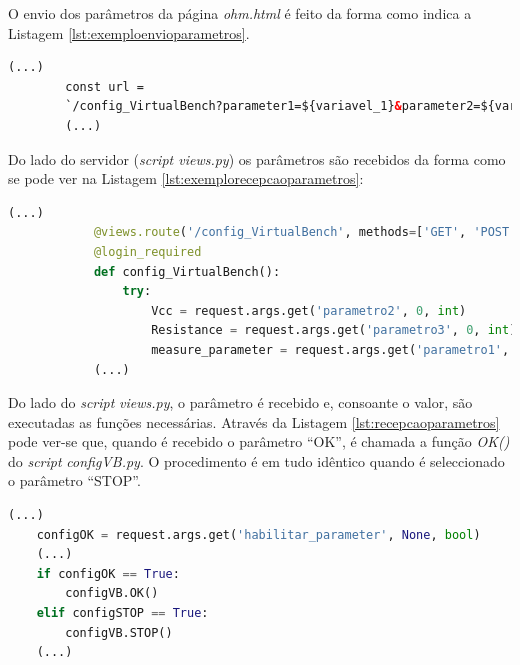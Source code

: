 O envio dos parâmetros da página \textit{ohm.html} é feito da forma como indica a Listagem \ref{lst:exemploenvioparametros}.

\begin{center}
	\begin{minipage}{0.7\linewidth}
		\begin{lstlisting}[language=Html, caption=Exemplo de envio de parâmetros da página \textit{ohm.html} para o \textit{script views.py}, label=lst:exemploenvioparametros]
		(...)
		const url = 
		`/config_VirtualBench?parameter1=${variavel_1}&parameter2=${variavel2}&parameter3=${variavel3}`
		(...)
	\end{lstlisting}
	\end{minipage}
\end{center}

Do lado do servidor (\textit{script views.py}) os parâmetros são recebidos da forma como se pode ver na Listagem \ref{lst:exemplorecepcaoparametros}:
\begin{center}
	\begin{minipage}{1\linewidth}
		\begin{lstlisting}[language=Python, caption=Exemplo da recepção dos parâmetros no \textit{script views.py} enviados da página \textit{ohm.html}, label=lst:exemplorecepcaoparametros]
			(...)
			@views.route('/config_VirtualBench', methods=['GET', 'POST'])
			@login_required
			def config_VirtualBench():
				try:
					Vcc = request.args.get('parametro2', 0, int)
					Resistance = request.args.get('parametro3', 0, int)
					measure_parameter = request.args.get('parametro1', 0, str)
			(...)
		\end{lstlisting}
	\end{minipage}
\end{center}

Do lado do \textit{script} \textit{views.py}, o parâmetro é recebido e, consoante o valor, são executadas as funções necessárias. Através da Listagem \ref{lst:recepcaoparametros} pode ver-se que, quando é recebido o parâmetro ``OK'', é chamada a função \textit{OK()} do \textit{script} \textit{configVB.py}. O procedimento é em tudo idêntico quando é seleccionado o parâmetro ``STOP''.

\begin{minipage}{0.9\linewidth}
	\begin{lstlisting}[language=python, caption=Recepção de parâmetros enviados de \textit{ohm.html}, label=lst:recepcaoparametros]
	(...)
	configOK = request.args.get('habilitar_parameter', None, bool)
	(...)
	if configOK == True:
        configVB.OK()      
    elif configSTOP == True:
        configVB.STOP()	
	(...)
	\end{lstlisting}
\end{minipage}

